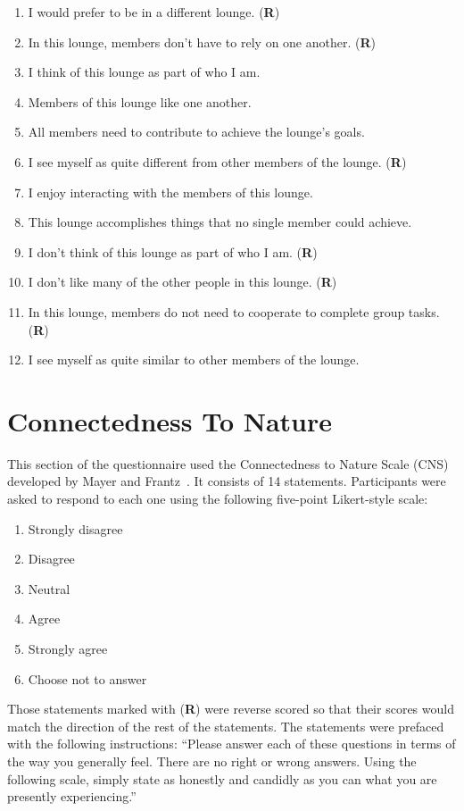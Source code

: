 \begin{enumerate}
	\item I would prefer to be in a different lounge. (\textbf{R})
	\item In this lounge, members don't have to rely on one another. (\textbf{R})
	\item I think of this lounge as part of who I am.
	\item Members of this lounge like one another.
	\item All members need to contribute to achieve the lounge's goals.
	\item I see myself as quite different from other members of the lounge. (\textbf{R})
	\item I enjoy interacting with the members of this lounge.
	\item This lounge accomplishes things that no single member could achieve.
	\item I don't think of this lounge as part of who I am. (\textbf{R})
	\item I don't like many of the other people in this lounge. (\textbf{R})
	\item In this lounge, members do not need to cooperate to complete group tasks. (\textbf{R})
	\item I see myself as quite similar to other members of the lounge.
\end{enumerate}


\section{Connectedness To Nature}
\label{cns-items}

This section of the questionnaire used the Connectedness to Nature Scale (CNS) developed by Mayer and Frantz~\cite{MayerFrantz2004}. It consists of 14 statements. Participants were asked to respond to each one using the following five-point Likert-style scale:

\begin{enumerate}
	\item Strongly disagree
	\item Disagree
	\item Neutral
	\item Agree
	\item Strongly agree
	\item Choose not to answer
\end{enumerate}

Those statements marked with (\textbf{R}) were reverse scored so that their scores would match the direction of the rest of the statements. The statements were prefaced with the following instructions: ``Please answer each of these questions in terms of the way you generally feel. There are no right or wrong answers. Using the following scale, simply state as honestly and candidly as you can what you are presently experiencing.''

